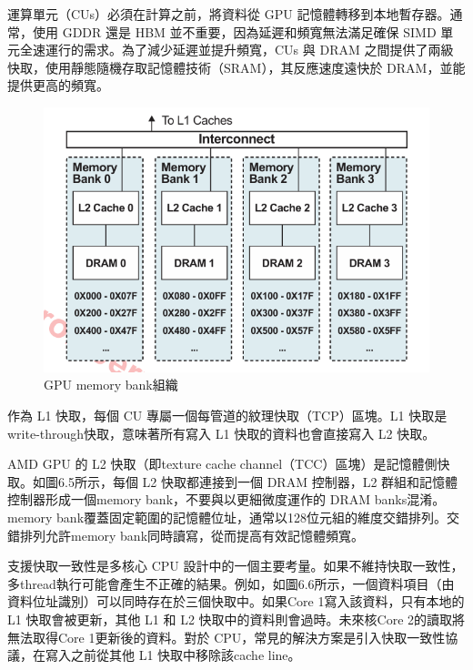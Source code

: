 運算單元（CUs）必須在計算之前，將資料從 GPU 記憶體轉移到本地暫存器。通常，使用 GDDR 還是 HBM 並不重要，因為延遲和頻寬無法滿足確保 SIMD 單元全速運行的需求。為了減少延遲並提升頻寬，CUs 與 DRAM 之間提供了兩級快取，使用靜態隨機存取記憶體技術（SRAM），其反應速度遠快於 DRAM，並能提供更高的頻寬。

\begin{figure}
    \centering
    \includegraphics[width=1\linewidth]{FileAusiliari//Screenshots/Figure6-5.png}
    \caption{GPU memory bank組織}
    \label{fig:enter-label}
\end{figure}

作為 L1 快取，每個 CU 專屬一個每管道的紋理快取（TCP）區塊。L1 快取是write-through快取，意味著所有寫入 L1 快取的資料也會直接寫入 L2 快取。


AMD GPU 的 L2 快取（即texture cache channel（TCC）區塊）是記憶體側快取。如圖6.5所示，每個 L2 快取都連接到一個 DRAM 控制器，L2 群組和記憶體控制器形成一個memory bank，不要與以更細微度運作的 DRAM banks混淆。memory bank覆蓋固定範圍的記憶體位址，通常以128位元組的維度交錯排列。交錯排列允許memory bank同時讀寫，從而提高有效記憶體頻寬。

支援快取一致性是多核心 CPU 設計中的一個主要考量。如果不維持快取一致性，多thread執行可能會產生不正確的結果。例如，如圖6.6所示，一個資料項目（由資料位址識別）可以同時存在於三個快取中。如果Core 1寫入該資料，只有本地的 L1 快取會被更新，其他 L1 和 L2 快取中的資料則會過時。未來核Core 2的讀取將無法取得Core 1更新後的資料。對於 CPU，常見的解決方案是引入快取一致性協議，在寫入之前從其他 L1 快取中移除該cache line。

